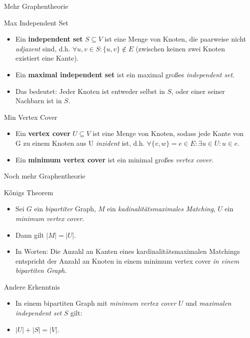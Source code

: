 \documentclass[18pt]{beamer}
\begin{document}
\begin{frame}{Mehr Graphentheorie}
\begin{block}{Max Independent Set}
\begin{itemize}
\item Ein \textbf{independent set} $S \subseteq V$ ist eine Menge von Knoten, die paarweise nicht \textit{adjazent} sind,
d.h. $\forall u, v \in S: \{u, v\} \notin E$ (zwischen keinen zwei Knoten existiert eine Kante).
\item Ein \textbf{maximal independent set} ist ein maximal gro{\ss}es \textit{independent set}.
\item Das bedeutet: Jeder Knoten ist entweder selbst in $S$, oder einer seiner Nachbarn ist in $S$.
\end{itemize}
\end{block}

\pause

\begin{block}{Min Vertex Cover}
\begin{itemize}
\item Ein \textbf{vertex cover} $U \subseteq V$ ist eine Menge von Knoten, sodass jede Kante von G zu einem Knoten aus U \textit{inzident} ist,
d.h. $\forall \{v, w\} = e \in E: \exists u \in U: u \in e$.
\item Ein \textbf{minimum vertex cover} ist ein minimal gro{\ss}es \textit{vertex cover}.
\end{itemize}
\end{block}
\end{frame}

\begin{frame}{Noch mehr Graphentheorie}
\begin{block}{Kőnigs Theorem }
\begin{itemize}
\item Sei $G$ ein \textit{bipartiter} Graph, $M$ ein \textit{kadinalit\"atsmaximales Matching}, $U$ ein \textit{minimum vertex cover}.
\item Dann gilt $|M| = |U|$.
\item In Worten: Die Anzahl an Kanten eines kardinalit\"atsmaximalen Matchings entspricht der Anzahl an Knoten in einem minimum vertex cover
\textit{in einem bipartiten Graph}.
\end{itemize}
\end{block}

\pause

\begin{block}{Andere Erkenntnis}
\begin{itemize}
\item In einem bipartiten Graph mit \textit{minimum vertex cover} $U$ und \textit{maximalen independent set} $S$ gilt:
\item $|U| + |S| = |V|$.
\end{itemize}
\end{block}
\end{frame}
\end{document}

